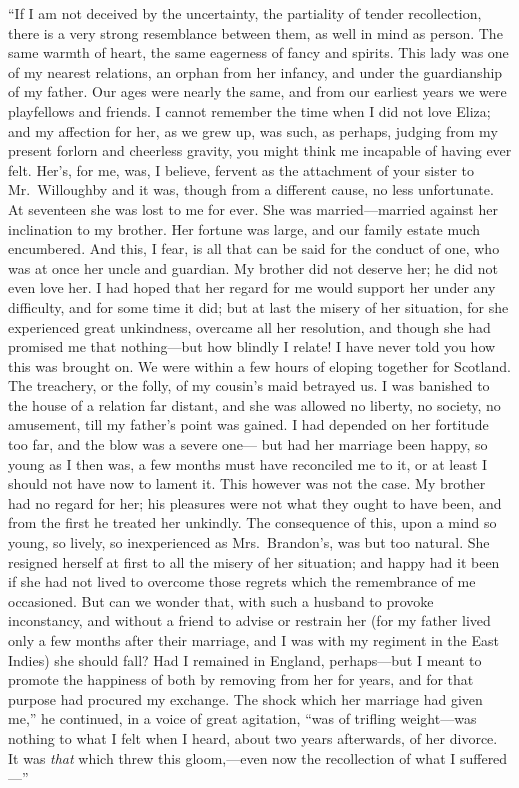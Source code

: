 ``If I am not deceived by the uncertainty, the partiality
of tender recollection, there is a very strong resemblance
between them, as well in mind as person.  The same warmth
of heart, the same eagerness of fancy and spirits.
This lady was one of my nearest relations, an orphan from
her infancy, and under the guardianship of my father.
Our ages were nearly the same, and from our earliest years
we were playfellows and friends.  I cannot remember the
time when I did not love Eliza; and my affection for her,
as we grew up, was such, as perhaps, judging from my
present forlorn and cheerless gravity, you might think me
incapable of having ever felt.  Her's, for me, was, I believe,
fervent as the attachment of your sister to Mr.\ Willoughby
and it was, though from a different cause, no less unfortunate.
At seventeen she was lost to me for ever.  She was
married---married against her inclination to my brother.
Her fortune was large, and our family estate much encumbered.
And this, I fear, is all that can be said for the
conduct of one, who was at once her uncle and guardian.
My brother did not deserve her; he did not even love her.
I had hoped that her regard for me would support her
under any difficulty, and for some time it did; but at
last the misery of her situation, for she experienced
great unkindness, overcame all her resolution, and though
she had promised me that nothing---but how blindly I
relate!  I have never told you how this was brought on.
We were within a few hours of eloping together for Scotland.
The treachery, or the folly, of my cousin's maid betrayed us.
I was banished to the house of a relation far distant,
and she was allowed no liberty, no society, no amusement,
till my father's point was gained.  I had depended on her
fortitude too far, and the blow was a severe one---%
but had her marriage been happy, so young as I then was,
a few months must have reconciled me to it, or at least
I should not have now to lament it.  This however
was not the case.  My brother had no regard for her;
his pleasures were not what they ought to have been,
and from the first he treated her unkindly.  The consequence
of this, upon a mind so young, so lively, so inexperienced
as Mrs.\ Brandon's, was but too natural.  She resigned
herself at first to all the misery of her situation;
and happy had it been if she had not lived to overcome those
regrets which the remembrance of me occasioned.  But can we
wonder that, with such a husband to provoke inconstancy,
and without a friend to advise or restrain her (for
my father lived only a few months after their marriage,
and I was with my regiment in the East Indies) she
should fall?  Had I remained in England, perhaps---but I
meant to promote the happiness of both by removing
from her for years, and for that purpose had procured
my exchange.  The shock which her marriage had given me,''
he continued, in a voice of great agitation, ``was of
trifling weight---was nothing to what I felt when I heard,
about two years afterwards, of her divorce.  It was
\emph{that} which threw this gloom,---even now the recollection
of what I suffered---''

